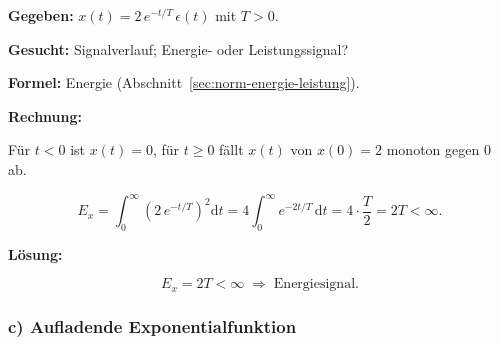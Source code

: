 \begin{beispiel}

\textbf{Gegeben:} $x(t) = 2\,e^{-t/T}\,\epsilon(t)$ mit $T > 0$.

\textbf{Gesucht:} Signalverlauf; Energie- oder Leistungssignal?

\textbf{Formel:} Energie (Abschnitt~\ref{sec:norm-energie-leistung}).

\textbf{Rechnung:}

Für $t < 0$ ist $x(t) = 0$, für $t \geq 0$ fällt $x(t)$ von $x(0) = 2$
monoton gegen $0$ ab.

$$
E_x = \int_0^{\infty} \left(2\,e^{-t/T}\right)^2 \mathrm{d}t
    = 4 \int_0^{\infty} e^{-2t/T}\,\mathrm{d}t
    = 4 \cdot \frac{T}{2} = 2T < \infty.
$$

\begin{center}
\end{center}

\textbf{Lösung:}

$$
\boxed{\;E_x = 2T < \infty \;\Rightarrow\; \text{Energiesignal.}\;}
$$

\end{beispiel}

\subsubsection*{c) Aufladende Exponentialfunktion}

